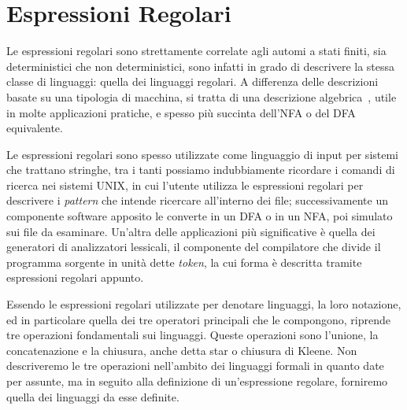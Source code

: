 \chapter{Espressioni Regolari}
\label{ch:espressioni_regolari}
Le espressioni regolari sono strettamente correlate agli automi a stati finiti, sia deterministici che non deterministici, sono infatti in grado di descrivere la stessa classe di linguaggi: quella dei linguaggi regolari. A differenza delle descrizioni basate su una tipologia di macchina, si tratta di una descrizione algebrica~\cite{hopcroft:alc}, utile in molte applicazioni pratiche, e spesso più succinta dell'NFA o del DFA equivalente.

Le espressioni regolari sono spesso utilizzate come linguaggio di input per sistemi che trattano stringhe, tra i tanti possiamo indubbiamente ricordare i comandi di ricerca nei sistemi UNIX, in cui l'utente utilizza le espressioni regolari per descrivere i \textit{pattern} che intende ricercare all'interno dei file; successivamente un componente software apposito le converte in un DFA o in un NFA, poi simulato sui file da esaminare. Un'altra delle applicazioni più significative è quella dei generatori di analizzatori lessicali, il componente del compilatore che divide il programma sorgente in unità dette \textit{token}, la cui forma è descritta tramite espressioni regolari appunto.

Essendo le espressioni regolari utilizzate per denotare linguaggi, la loro notazione, ed in particolare quella dei tre operatori principali che le compongono, riprende tre operazioni fondamentali sui linguaggi. Queste operazioni sono l'unione, la concatenazione e la chiusura, anche detta star o chiusura di Kleene. Non descriveremo le tre operazioni nell'ambito dei linguaggi formali in quanto date per assunte, ma in seguito alla definizione di un'espressione regolare, forniremo quella dei linguaggi da esse definite.

